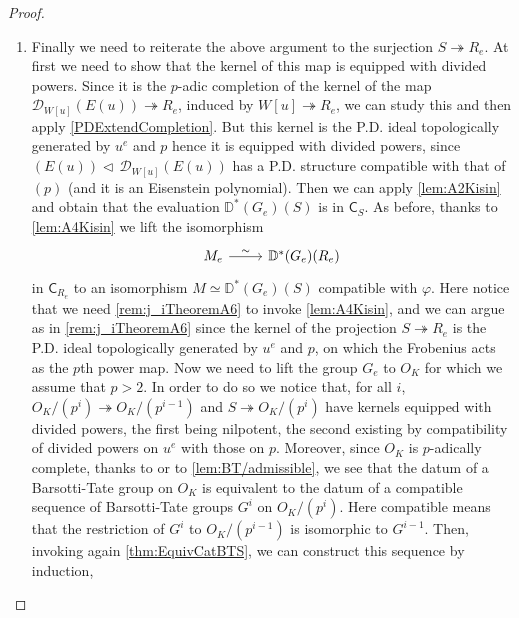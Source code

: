 \begin{proof}
\begin{enumerate}
\item Finally we need to reiterate the above argument to the surjection
	$S \twoheadrightarrow R_e$.
	At first we need to show that the kernel of this map is equipped with divided powers.
	Since it is the $p$-adic completion of the kernel
	of the map $\mathcal{D}_{W[u]}(E(u)) \twoheadrightarrow R_e$,
	induced by $W[u] \twoheadrightarrow R_e$, we can study this and
	then apply \cref{PDExtendCompletion}.
	But this kernel is the P.D. ideal topologically generated 
	by $u^e$ and $p$ hence it is equipped with divided powers,
	since $(E(u)) \triangleleft\, \mathcal{D}_{W[u]}(E(u))$ has a P.D. structure
	compatible with that of $(p)$ (and it is an Eisenstein polynomial).
	Then we can apply \cref{lem:A2Kisin} and obtain that the evaluation
	$\mathbb{D}^*(G_e)(S)$ is in $\mathsf{C}_{S}$.
	As before, thanks to \cref{lem:A4Kisin} we lift the isomorphism 
	\begin{equation*}
	\begin{tikzcd}
		M_e \arrow[r, "\sim", rightarrow] &
		\mathbb{D}^*(G_e)(R_e)
	\end{tikzcd}
	\end{equation*}
	in $\mathsf{C}_{R_e}$ to an isomorphism $M \simeq \mathbb{D}^*(G_e)(S)$
	compatible with $\varphi$.
	Here notice that we need \cref{rem:j_iTheoremA6} to invoke
	\cref{lem:A4Kisin}, and we can argue as in \cref{rem:j_iTheoremA6}
	since the kernel of the projection $S \twoheadrightarrow R_e$ is
	the P.D. ideal topologically generated by $u^e$ and $p$,
	on which the Frobenius acts as the $p$th power map.
	Now we need to lift the group $G_e$ to $O_K$ for which we assume that $p > 2$.
	In order to do so we notice that, for all $i$,
	$O_K/ (p^{i}) \twoheadrightarrow O_K/ (p^{ i-1 })$ and
	$S \twoheadrightarrow O_K/ (p^i)$ have kernels equipped with
	divided powers, the first being nilpotent, the second existing by compatibility
	of divided powers on $u^e$ with those on $p$.
	Moreover, since $O_K$ is $p$-adically complete, thanks to \cite[Lemma 2.4.4]{deJong}
	or to \cref{lem:BT/admissible},
	we see that the datum of a Barsotti-Tate group on $O_K$ is equivalent to
	the datum of a compatible sequence of Barsotti-Tate groups $G^i$ on $O_K/ (p^i)$.
	Here compatible means that the restriction of $G^i$ to $O_K/ (p^{i-1})$
	is isomorphic to $G^{i-1}$.
	Then, invoking again \cref{thm:EquivCatBTS}, we can construct this sequence by induction,

\end{enumerate}
\end{proof}
